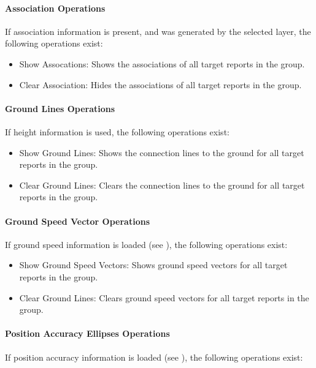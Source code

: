 \paragraph{Association Operations}
If association information is present, and was generated by the selected layer, the following operations exist:

\begin{itemize}
 \item Show Assocations: Shows the associations of all target reports in the group.
 \item Clear Association: Hides the associations of all target reports in the group.
\end{itemize} 


\paragraph{Ground Lines Operations}
If height information is used, the following operations exist:

\begin{itemize}
 \item Show Ground Lines: Shows the connection lines to the ground for all target reports in the group.
 \item Clear Ground Lines: Clears the connection lines to the ground for all target reports in the group.
\end{itemize} 


\paragraph{Ground Speed Vector Operations}
If ground speed information is loaded (see ), the following operations exist:

\begin{itemize}
 \item Show Ground Speed Vectors: Shows ground speed vectors for all target reports in the group.
 \item Clear Ground Lines: Clears ground speed vectors for all target reports in the group.
\end{itemize} 

\paragraph{Position Accuracy Ellipses Operations}
If position accuracy information is loaded (see ), the following operations exist:

